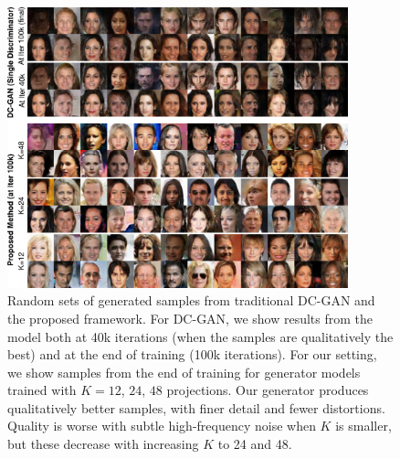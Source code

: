 \documentclass{article}
\begin{document}
\begin{figure}[!t]
  \centering
    \includegraphics[width=0.88\textwidth]{Figs/Fig3.pdf}
\caption{Random sets of generated samples from traditional DC-GAN and the proposed framework. For DC-GAN, we show results from the model both at 40k iterations (when the samples are qualitatively the best) and at the end of training (100k iterations). For our setting, we show samples from the end of training for generator models trained with $K=12$, $24$, $48$ projections. Our generator produces qualitatively better samples, with finer detail and fewer distortions. Quality is worse with subtle high-frequency noise when $K$ is smaller, but these decrease with increasing $K$ to 24 and 48.} %
  \label{fig:thefaces}
\end{figure}
\end{document}
